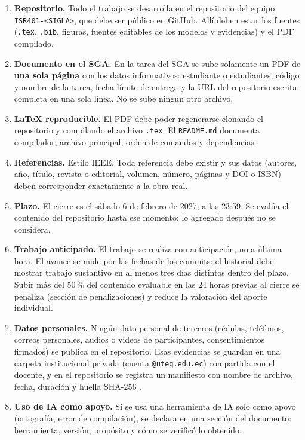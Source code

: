 \documentclass[11pt]{article}
\begin{document}
\begin{enumerate}[leftmargin=20pt,itemsep=3pt]
	\item \textbf{Repositorio.} Todo el trabajo se desarrolla en el repositorio del equipo \texttt{ISR401-<SIGLA>}, que debe ser público en GitHub. Allí deben estar los fuentes (\texttt{.tex}, \texttt{.bib}, figuras, fuentes editables de los modelos y evidencias) y el PDF compilado.
	\item \textbf{Documento en el SGA.} En la tarea del SGA se sube solamente un PDF de \textbf{una sola página} con los datos informativos: estudiante o estudiantes, código y nombre de la tarea, fecha límite de entrega y la URL del repositorio escrita completa en una sola línea. No se sube ningún otro archivo.
	\item \textbf{\LaTeX{} reproducible.} El PDF debe poder regenerarse clonando el repositorio y compilando el archivo \texttt{.tex}. El \texttt{README.md} documenta compilador, archivo principal, orden de comandos y dependencias.
	\item \textbf{Referencias.} Estilo IEEE. Toda referencia debe existir y sus datos (autores, año, título, revista o editorial, volumen, número, páginas y DOI o ISBN) deben corresponder exactamente a la obra real.
	\item \textbf{Plazo.} El cierre es el sábado 6 de febrero de 2027, a las 23:59. Se evalúa el contenido del repositorio hasta ese momento; lo agregado después no se considera.
	\item \textbf{Trabajo anticipado.} El trabajo se realiza con anticipación, no a última hora. El avance se mide por las fechas de los commits: el historial debe mostrar trabajo sustantivo en al menos tres días distintos dentro del plazo. Subir más del 50\,\% del contenido evaluable en las 24 horas previas al cierre se penaliza (sección de penalizaciones) y reduce la valoración del aporte individual.
	\item \textbf{Datos personales.} Ningún dato personal de terceros (cédulas, teléfonos, correos personales, audios o videos de participantes, consentimientos firmados) se publica en el repositorio. Esas evidencias se guardan en una carpeta institucional privada (cuenta \texttt{@uteq.edu.ec}) compartida con el docente, y en el repositorio se registra un manifiesto con nombre de archivo, fecha, duración y huella SHA-256 \citep{lopdp_2021}.
	\item \textbf{Uso de IA como apoyo.} Si se usa una herramienta de IA solo como apoyo (ortografía, error de compilación), se declara en una sección del documento: herramienta, versión, propósito y cómo se verificó lo obtenido.
\end{enumerate}
\end{document}
